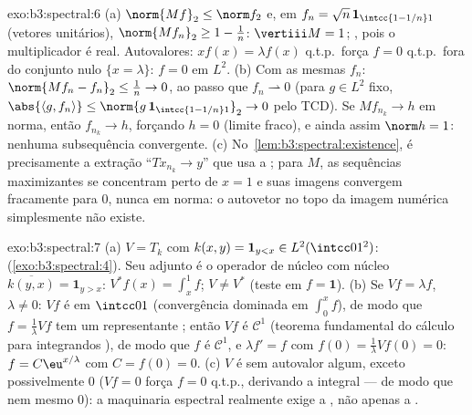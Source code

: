 \begin{solution}{exo:b3:spectral:6}
(a) $\norm{Mf}_2 \leq \norm f_2$ e, em $f_n = \sqrt n\,
\mathbf 1_{\intcc{1 - 1/n}1}$ (vetores unitários), $\norm{Mf_n}_2
\geq 1 - \frac1n$: $\vertiii M = 1$; , pois o
multiplicador é real. Autovalores: $xf(x) = \lambda f(x)$ q.t.p.\
força $f = 0$ q.t.p.\ fora do conjunto nulo $\{x = \lambda\}$: $f =
0$ em $L^2$.
(b) Com as mesmas $f_n$: $\norm{Mf_n - f_n}_2 \leq \frac1n \to
0$, ao passo que $f_n \rightharpoonup 0$ (para $g \in L^2$ fixo,
$\abs{\langle g, f_n\rangle} \leq \norm{g\,\mathbf
1_{\intcc{1-1/n}1}}_2 \to 0$ pelo TCD). Se $Mf_{n_k} \to h$ em
norma, então $f_{n_k} \to h$, forçando $h = 0$ (limite fraco), e ainda assim
$\norm h = 1$: nenhuma subsequência convergente.
(c) No~\cref{lem:b3:spectral:existence}, é precisamente a
extração ``$Tx_{n_k} \to y$'' que usa a ; para $M$, as
sequências maximizantes se concentram perto de $x = 1$ e suas
imagens convergem fracamente para $0$, nunca em norma: o autovetor
no topo da imagem numérica simplesmente não existe.
\end{solution}

\begin{solution}{exo:b3:spectral:7}
(a) $V = T_k$ com $k(x, y) = \mathbf 1_{y < x} \in
L^2(\intcc01^2)$:  (\cref{exo:b3:spectral:4}). Seu
adjunto é o operador de núcleo com núcleo $\overline{k(y,
x)} = \mathbf 1_{y > x}$: $V^*f(x) = \int_x^1f$; $V \neq V^*$
(teste em $f = \mathbf 1$).
(b) Se $Vf = \lambda f$, $\lambda \ne 0$: $Vf$ é 
em $\intcc01$ (convergência dominada em $\int_0^x f$), de modo que $f
= \frac1\lambda Vf$ tem um representante ; então
$Vf$ é $\mathcal C^1$ (teorema fundamental do cálculo para
integrandos ), de modo que $f$ é $\mathcal C^1$, e
$\lambda f' = f$ com $f(0) = \frac1\lambda Vf(0) = 0$: $f =
C\eu^{x/\lambda}$ com $C = f(0) = 0$.
(c) $V$ é  sem autovalor algum, exceto possivelmente
$0$ ($Vf = 0$ força $f = 0$ q.t.p., derivando a
integral --- de modo que nem mesmo $0$): a maquinaria espectral
realmente exige a , não apenas a .
\end{solution}

